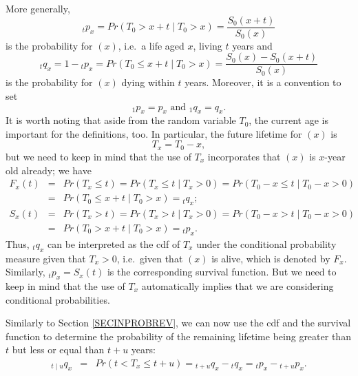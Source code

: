 \documentclass[11pt,fleqn,oneside]{book}
\begin{document}
More generally,
$$
{_tp_x} = Pr(T_0> x+t \mid T_0>x) = \frac{S_0(x+t)}{S_0(x)}
$$
is the probability for $(x)$, i.e.\ a life aged $x$, living $t$ years and
 $$
{_tq_x}  = 1 - {_tp_x} = Pr(T_0 \leq  x+t \mid T_0>x) = \frac{S_0(x) - S_0(x+t)}{S_0(x)}
$$
is the probability for $(x)$ dying within $t$ years. Moreover, it is a convention to set
$$
{_1p_x}= {p_x}\text{ and } {_1q_x} = {q_x}.
$$
It is worth noting that aside from the random variable $T_0$, the current age is important for the definitions, too. In particular, the future lifetime for $(x)$ is 
$$
T_x = T_0 - x,
$$
but we need to keep in mind that the use of $T_x$ incorporates that $(x)$ is $x$-year old already; we have
\begin{eqnarray*}
F_x(t) &=& Pr(T_x \leq t) = Pr(T_x \leq t \mid T_x>0) = Pr(T_0-x \leq t \mid T_0-x>0) \\
&=& Pr(T_0 \leq x + t \mid T_0 > x) = {_tq_x}; \\
S_x(t) &=& Pr(T_x > t) = Pr(T_x > t \mid T_x > 0) = Pr(T_0-x > t \mid T_0-x>0) \\
&=& Pr(T_0 > x+t \mid T_0>x) = {_tp_x}.
\end{eqnarray*}
Thus, ${_tq_x}$ can be interpreted as the cdf of $T_x$ under the conditional probability measure given that $T_x > 0$, i.e.\ given that $(x)$ is alive, which is denoted by $F_x$. Similarly, $_tp_x = S_x(t)$ is the corresponding survival function. But we need to keep in mind that the use of $T_x$ automatically implies that we are considering conditional probabilities. 


Similarly to Section \ref{SECINPROBREV}, we can now use the cdf and the survival function to determine the probability of the remaining lifetime being greater than $t$ but less or equal than $t+u$ years:
\begin{eqnarray*}
{_{t\mid u}q_x} &=& Pr(t < T_x \leq t+u) = {_{t+u}q_x} - {_tq_x} ={_{t}p_x} - {_{t+u}p_x}.
\end{eqnarray*}
\end{document}
